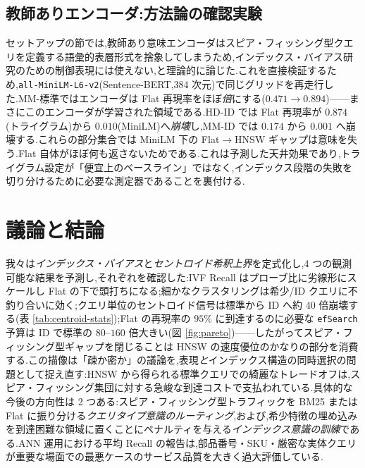 \documentclass[conference]{IEEEtran}
\begin{document}
\subsection{教師ありエンコーダ:方法論の確認実験}\label{sec:supervised-confirm}

セットアップの節では,教師あり意味エンコーダはスピア・フィッシング型クエリを定義する語彙的表層形式を捨象してしまうため,インデックス・バイアス研究のための制御表現には使えない,と理論的に論じた.これを直接検証するため,\texttt{all-MiniLM-L6-v2}(Sentence-BERT,$384$ 次元)で同じグリッドを再走行した.MM-標準ではエンコーダは Flat 再現率をほぼ\emph{倍}にする($0.471 \to 0.894$)——まさにこのエンコーダが学習された領域である.HD-ID では Flat 再現率が $0.874$(トライグラム)から $0.010$(MiniLM)へ\emph{崩壊}し,MM-ID では $0.174$ から $0.001$ へ崩壊する.これらの部分集合では MiniLM 下の Flat$\to$HNSW ギャップは意味を失う.Flat 自体がほぼ何も返さないためである.これは予測した天井効果であり,トライグラム設定が「便宜上のベースライン」ではなく,インデックス段階の失敗を切り分けるために必要な測定器であることを裏付ける.

\section{議論と結論}

我々は\emph{インデックス・バイアス}と\emph{セントロイド希釈上界}を定式化し,4 つの観測可能な結果を予測し,それぞれを確認した:IVF Recall はプローブ比に劣線形にスケールし Flat の下で頭打ちになる;細かなクラスタリングは希少/ID クエリに不釣り合いに効く;クエリ単位のセントロイド信号は標準から ID へ約 40 倍崩壊する(表 \ref{tab:centroid-stats});Flat の再現率の $95\%$ に到達するのに必要な \texttt{efSearch} 予算は ID で標準の $80$--$160$ 倍大きい(図 \ref{fig:pareto})——したがってスピア・フィッシング型ギャップを閉じることは HNSW の速度優位のかなりの部分を消費する.この描像は「疎か密か」の議論を,表現\emph{と}インデックス構造の同時選択の問題として捉え直す:HNSW から得られる標準クエリでの綺麗なトレードオフは,スピア・フィッシング集団に対する急峻な到達コストで支払われている.具体的な今後の方向性は 2 つある:スピア・フィッシング型トラフィックを BM25 または Flat に振り分ける\emph{クエリタイプ意識のルーティング},および,希少特徴の埋め込みを到達困難な領域に置くことにペナルティを与える\emph{インデックス意識の訓練}である.ANN 運用における平均 Recall の報告は,部品番号・SKU・厳密な実体クエリが重要な場面での最悪ケースのサービス品質を大きく過大評価している.

\end{document}
